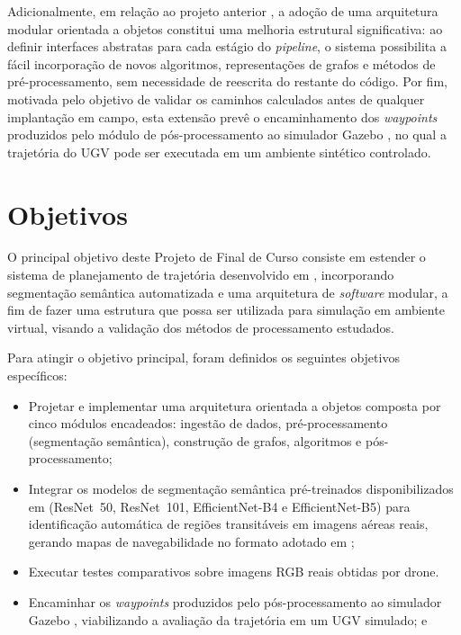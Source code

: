 \documentclass[
    12pt,
    openright,
    oneside,
    a4paper,
    english,
    brazil
]{abntex2}
\begin{document}
Adicionalmente, em relação ao projeto anterior \cite{camelo2025}, a adoção de uma arquitetura modular orientada a objetos constitui uma melhoria estrutural significativa: ao definir interfaces abstratas para cada estágio do \textit{pipeline}, o sistema possibilita a fácil incorporação de novos algoritmos, representações de grafos e métodos de pré-processamento, sem necessidade de reescrita do restante do código. Por fim, motivada pelo objetivo de validar os caminhos calculados antes de qualquer implantação em campo, esta extensão prevê o encaminhamento dos \textit{waypoints} produzidos pelo módulo de pós-processamento ao simulador Gazebo \cite{koenig2004}, no qual a trajetória do UGV pode ser executada em um ambiente sintético controlado.

\section{Objetivos}

O principal objetivo deste Projeto de Final de Curso consiste em estender o sistema de planejamento de trajetória desenvolvido em \cite{camelo2025}, incorporando segmentação semântica automatizada e uma arquitetura de \textit{software} modular, a fim de fazer uma estrutura que possa ser utilizada para simulação em ambiente virtual, visando a validação dos métodos de processamento estudados. 

Para atingir o objetivo principal, foram definidos os seguintes objetivos específicos:
\begin{itemize}
    \item Projetar e implementar uma arquitetura orientada a objetos composta por cinco módulos encadeados: ingestão de dados, pré-processamento (segmentação semântica), construção de grafos, algoritmos e pós-processamento;
    \item Integrar os modelos de segmentação semântica pré-treinados disponibilizados em \cite{junior2024_models} (ResNet~50, ResNet~101, EfficientNet-B4 e EfficientNet-B5) para identificação automática de regiões transitáveis em imagens aéreas reais, gerando mapas de navegabilidade no formato adotado em \cite{junior2025_rrt};
    \item Executar testes comparativos sobre imagens RGB reais obtidas por drone.
    \item Encaminhar os \textit{waypoints} produzidos pelo pós-processamento ao simulador Gazebo \cite{koenig2004}, viabilizando a avaliação da trajetória em um UGV simulado; e
\end{itemize}
\end{document}
